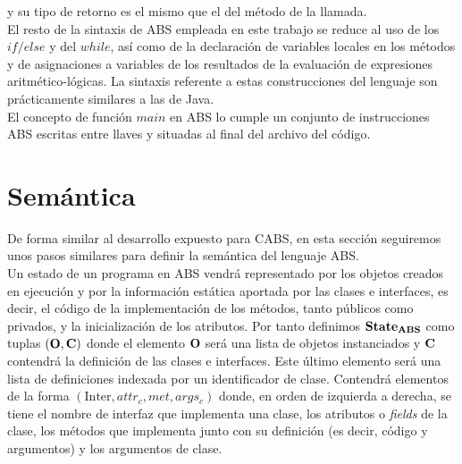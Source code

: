 

y su tipo de retorno es el mismo que el del método de la llamada.\\

El resto de la sintaxis de ABS empleada en este trabajo se reduce al uso de los $if/else$ y del $while$, así como de la declaración de variables locales en los métodos y de asignaciones a variables de los resultados de la evaluación de expresiones aritmético-lógicas. La sintaxis referente a estas construcciones del lenguaje son prácticamente similares a las de Java.\\

El concepto de función $main$ en ABS lo cumple un conjunto de instrucciones ABS escritas entre llaves y situadas al final del archivo del código.

\section{Semántica}

De forma similar al desarrollo expuesto para CABS, en esta sección seguiremos unos pasos similares para definir la semántica del lenguaje ABS.\\

Un estado de un programa en ABS vendrá representado por los objetos creados en ejecución y por la información estática aportada por las clases e interfaces, es decir, el código de la implementación de los métodos, tanto públicos como privados, y la inicialización de los atributos. Por tanto definimos $\textbf{State}_{\textbf{ABS}}$ como tuplas $(\mathbf{O}, \mathbf{C})$ donde el elemento $\mathbf{O}$ será una lista de objetos instanciados y $\mathbf{C}$ contendrá la definición de las clases e interfaces. Este último elemento será una lista de definiciones indexada por un identificador de clase. Contendrá elementos de la forma $(\mbox{Inter}, attr_c, met, args_c)$ donde, en orden de izquierda a derecha, se tiene el nombre de interfaz que implementa una clase, los atributos o \emph{fields} de la clase, los métodos que implementa junto con su definición (es decir, código y argumentos) y los argumentos de clase.\\

